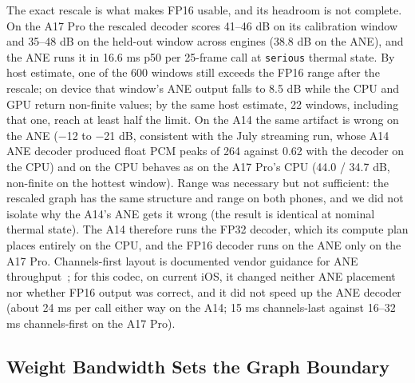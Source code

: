 \documentclass[11pt]{article}
\newcommand{\code}[1]{\texttt{#1}}
\begin{document}
The exact rescale is what makes FP16 usable, and its headroom is not complete. On the A17 Pro the rescaled decoder scores 41--46 dB on its calibration window and 35--48 dB on the held-out window across engines (38.8 dB on the ANE), and the ANE runs it in 16.6 ms p50 per 25-frame call at \code{serious} thermal state. By host estimate, one of the 600 windows still exceeds the FP16 range after the rescale; on device that window's ANE output falls to 8.5 dB while the CPU and GPU return non-finite values; by the same host estimate, 22 windows, including that one, reach at least half the limit. On the A14 the same artifact is wrong on the ANE ($-$12 to $-$21 dB, consistent with the July streaming run, whose A14 ANE decoder produced float PCM peaks of 264 against 0.62 with the decoder on the CPU) and on the CPU behaves as on the A17 Pro's CPU (44.0 / 34.7 dB, non-finite on the hottest window). Range was necessary but not sufficient: the rescaled graph has the same structure and range on both phones, and we did not isolate why the A14's ANE gets it wrong (the result is identical at nominal thermal state). The A14 therefore runs the FP32 decoder, which its compute plan places entirely on the CPU, and the FP16 decoder runs on the ANE only on the A17 Pro. Channels-first layout is documented vendor guidance for ANE throughput~\citep{apple-ane-transformers}; for this codec, on current iOS, it changed neither ANE placement nor whether FP16 output was correct, and it did not speed up the ANE decoder (about 24 ms per call either way on the A14; 15 ms channels-last against 16--32 ms channels-first on the A17 Pro).

\subsection{Weight Bandwidth Sets the Graph Boundary}\label{sec:cs2-bandwidth}
\end{document}
